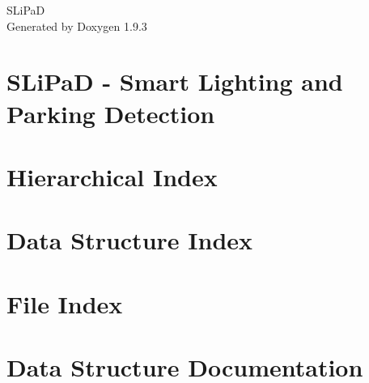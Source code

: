 \documentclass[twoside]{book}
\newcommand{\+}{\discretionary{\mbox{\scriptsize$\hookleftarrow$}}{}{}}
\newcommand{\clearemptydoublepage}{%
    \newpage{\pagestyle{empty}\cleardoublepage}%
  }
\begin{document}
  \raggedbottom
    \hypersetup{pageanchor=false,
                bookmarksnumbered=true,
                pdfencoding=unicode
               }
  \begin{titlepage}
  \vspace*{7cm}
  \begin{center}%
  {\Large SLi\+PaD}\\
  \vspace*{1cm}
  {\large Generated by Doxygen 1.9.3}\\
  \end{center}
  \end{titlepage}
  \clearemptydoublepage
  \tableofcontents
  \clearemptydoublepage
  \hypersetup{pageanchor=true}
\chapter{SLi\+PaD -\/ Smart Lighting and Parking Detection}
\label{md__r_e_a_d_m_e}

\chapter{Hierarchical Index}

\chapter{Data Structure Index}

\chapter{File Index}

\chapter{Data Structure Documentation}



























\end{document}
